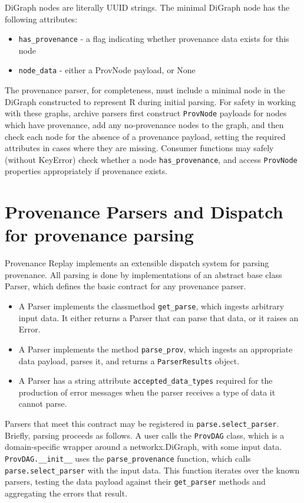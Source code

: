 DiGraph nodes are literally UUID strings. The minimal DiGraph node has the
following attributes:
\begin{itemize}
    \item \texttt{has\_provenance} - a flag indicating whether provenance data exists for this node
    \item \texttt{node\_data} - either a ProvNode payload, or None
\end{itemize}

The provenance parser, for completeness, must include a minimal node in the
DiGraph constructed to represent R during initial parsing. For safety in working
with these graphs, archive parsers first construct \texttt{ProvNode} payloads for nodes
which have provenance, add any no-provenance nodes to the graph, and then check
each node for the absence of a provenance payload, setting the required
attributes in cases where they are missing. Consumer functions may safely
(without KeyError) check whether a node \texttt{has\_provenance}, and access \texttt{ProvNode}
properties appropriately if provenance exists.

\section{Provenance Parsers and Dispatch for provenance parsing}

Provenance Replay implements an extensible dispatch system for parsing
provenance. All parsing is done by implementations of an abstract base class
Parser, which defines the basic contract for any provenance parser. 
\begin{itemize}
    \item A Parser implements the classmethod \texttt{get\_parse}, which ingests arbitrary input data. It either returns a Parser that can parse that data, or it raises an Error.
    \item A Parser implements the method \texttt{parse\_prov}, which ingests an appropriate data payload, parses it, and returns a \texttt{ParserResults} object.
    \item A Parser has a string attribute \texttt{accepted\_data\_types} required for the production of error messages when the parser receives a type of data it cannot parse.
\end{itemize}

Parsers that meet this contract may be registered in \texttt{parse.select\_parser}.
Briefly, parsing proceeds as follows. A user calls the \texttt{ProvDAG} class, which is a
domain-specific wrapper around a networkx.DiGraph, with some input data.
\texttt{ProvDAG.\_\_init\_\_} uses the \texttt{parse\_provenance} function, which calls
\texttt{parse.select\_parser} with the input data. This function iterates over the known
parsers, testing the data payload against their \texttt{get\_parser} methods and
aggregating the errors that result. 

